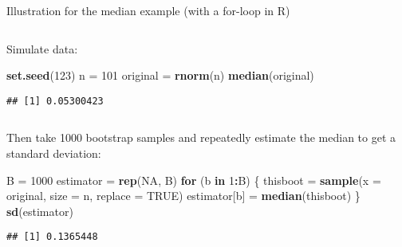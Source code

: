 \documentclass[10pt,ignorenonframetext,]{beamer}
\newenvironment{Shaded}{\begin{snugshade}}{\end{snugshade}}
\newcommand{\ControlFlowTok}[1]{\textcolor[rgb]{0.13,0.29,0.53}{\textbf{#1}}}
\newcommand{\DataTypeTok}[1]{\textcolor[rgb]{0.13,0.29,0.53}{#1}}
\newcommand{\DecValTok}[1]{\textcolor[rgb]{0.00,0.00,0.81}{#1}}
\newcommand{\KeywordTok}[1]{\textcolor[rgb]{0.13,0.29,0.53}{\textbf{#1}}}
\newcommand{\NormalTok}[1]{#1}
\newcommand{\OperatorTok}[1]{\textcolor[rgb]{0.81,0.36,0.00}{\textbf{#1}}}
\newcommand{\OtherTok}[1]{\textcolor[rgb]{0.56,0.35,0.01}{#1}}
\newcommand{\StringTok}[1]{\textcolor[rgb]{0.31,0.60,0.02}{#1}}
\begin{document}
\begin{frame}[fragile]

\begin{block}{Illustration for the median example (with a for-loop in
R)}

\(~\)

Simulate data:

\vspace{2mm}

\scriptsize

\begin{Shaded}
\begin{Highlighting}[]
\KeywordTok{set.seed}\NormalTok{(}\DecValTok{123}\NormalTok{)}
\NormalTok{n =}\StringTok{ }\DecValTok{101}
\NormalTok{original =}\StringTok{ }\KeywordTok{rnorm}\NormalTok{(n)}
\KeywordTok{median}\NormalTok{(original)}
\end{Highlighting}
\end{Shaded}

\begin{verbatim}
## [1] 0.05300423
\end{verbatim}

\(~\)

\normalsize

Then take 1000 bootstrap samples and repeatedly estimate the median to
get a standard deviation:

\vspace{2mm}

\scriptsize

\begin{Shaded}
\begin{Highlighting}[]
\NormalTok{B =}\StringTok{ }\DecValTok{1000}
\NormalTok{estimator =}\StringTok{ }\KeywordTok{rep}\NormalTok{(}\OtherTok{NA}\NormalTok{, B)}
\ControlFlowTok{for}\NormalTok{ (b }\ControlFlowTok{in} \DecValTok{1}\OperatorTok{:}\NormalTok{B) \{}
\NormalTok{    thisboot =}\StringTok{ }\KeywordTok{sample}\NormalTok{(}\DataTypeTok{x =}\NormalTok{ original, }\DataTypeTok{size =}\NormalTok{ n, }\DataTypeTok{replace =} \OtherTok{TRUE}\NormalTok{)}
\NormalTok{    estimator[b] =}\StringTok{ }\KeywordTok{median}\NormalTok{(thisboot)}
\NormalTok{\}}
\KeywordTok{sd}\NormalTok{(estimator)}
\end{Highlighting}
\end{Shaded}

\begin{verbatim}
## [1] 0.1365448
\end{verbatim}

\end{block}

\end{frame}
\end{document}
